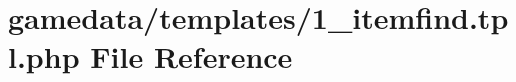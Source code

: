 \hypertarget{1__itemfind_8tpl_8php}{\section{gamedata/templates/1\+\_\+itemfind.tpl.\+php File Reference}
\label{1__itemfind_8tpl_8php}
}
